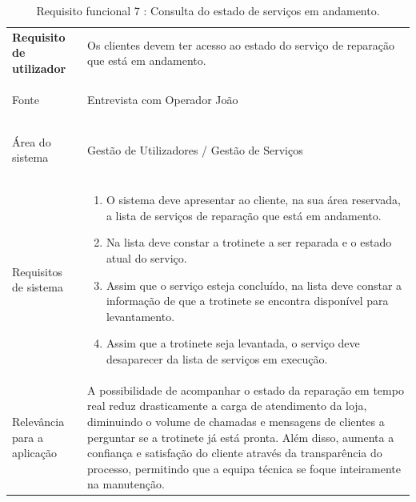 \documentclass[a4paper,12pt]{scrreprt}
\begin{document}
\begin{table}[H]
    \centering
    \renewcommand{\arraystretch}{1.5} 
    
    \begin{tabular}{|>{\columncolor{gray!15}\bfseries}p{4cm}|p{10.5cm}|}
        \hline
        Requisito de utilizador & Os clientes devem ter acesso ao estado do serviço de reparação que está em andamento. \\ \hdashline
        
        Fonte & Entrevista com Operador João \\ \hdashline
        
        Área do sistema & Gestão de Utilizadores / Gestão de Serviços \\ \hdashline
        
        Requisitos de sistema & 
        \begin{enumerate}[leftmargin=*, nosep, topsep=2pt, partopsep=0pt]
            \item O sistema deve apresentar ao cliente, na sua área reservada, a lista de serviços de reparação que está em andamento.
            \item Na lista deve constar a trotinete a ser reparada e o estado atual do serviço.
            \item Assim que o serviço esteja concluído, na lista deve constar a informação de que a trotinete se encontra disponível para levantamento.
            \item Assim que a trotinete seja levantada, o serviço deve desaparecer da lista de serviços em execução.
        \end{enumerate} \\ \hdashline
        
        Relevância para a aplicação & A possibilidade de acompanhar o estado da reparação em tempo real reduz drasticamente a carga de atendimento da loja, diminuindo o volume de chamadas e mensagens de clientes a perguntar se a trotinete já está pronta. Além disso, aumenta a confiança e satisfação do cliente através da transparência do processo, permitindo que a equipa técnica se foque inteiramente na manutenção.\\ \hline
    \end{tabular}
    \caption{Requisito funcional 7 : Consulta do estado de serviços em andamento.}
    \label{tab:rf_estado_servicos}
\end{table}
\end{document}
